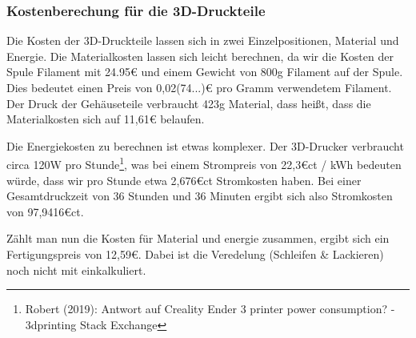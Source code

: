 \subsubsection{Kostenberechung für die 3D-Druckteile}
Die Kosten der 3D-Druckteile lassen sich in zwei Einzelpositionen, Material und Energie.
Die Materialkosten lassen sich leicht berechnen, da wir die Kosten der Spule Filament mit 24.95\euro{} und einem Gewicht von 800g Filament auf der Spule.
Dies bedeutet einen Preis von 0,02(74...)\euro{} pro Gramm verwendetem Filament.
Der Druck der Gehäuseteile verbraucht 423g Material, dass heißt, dass die Materialkosten sich auf 11,61\euro{} belaufen.\par
\noindent Die Energiekosten zu berechnen ist etwas komplexer.
Der 3D-Drucker verbraucht circa 120W pro Stunde\footnote{Robert (2019): Antwort auf Creality Ender 3 printer power consumption? - 3dprinting Stack Exchange}, was bei einem Strompreis von 22,3\euro{}ct / kWh bedeuten würde, dass wir pro Stunde etwa 2,676\euro{}ct Stromkosten haben. 
Bei einer Gesamtdruckzeit von 36 Stunden und 36 Minuten ergibt sich also Stromkosten von 97,9416\euro{}ct.\par
\noindent Zählt man nun die Kosten für Material und energie zusammen, ergibt sich ein Fertigungspreis von 12,59\euro{}. 
Dabei ist die Veredelung (Schleifen \& Lackieren) noch nicht mit einkalkuliert.\par